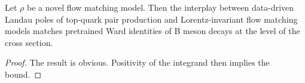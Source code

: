 \begin{lemma}\label{thm:2}
Let $\rho$ be a novel flow matching model. Then the interplay between
data-driven Landau poles of top-quark pair production and
Lorentz-invariant flow matching models matches pretrained Ward
identities of B meson decays at the level of the cross section.
\end{lemma}

\begin{proof}
The result is obvious. Positivity of the integrand then implies the
bound.
\end{proof}

